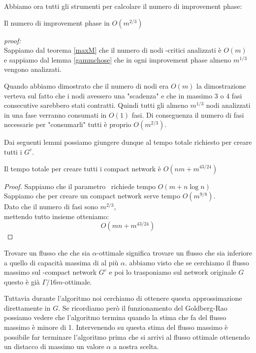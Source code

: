 Abbiamo ora tutti gli strumenti per calcolare il numero di improvement phase:
\begin{lemma}{}{}
    Il numero di improvement phase in $O(m^{2/3})$
\end{lemma}
\textit{proof:}\\
    Sappiamo dal teorema \ref{maxM} che il numero di nodi \gmm-critici analizzati è $O(m)$ e sappiamo dal lemma \ref{gammchose} che in ogni improvement phase almeno $m^{1/3}$ vengono analizzati.
    
    Quando abbiamo dimostrato che il numero di nodi era $O(m)$ la dimostrazione verteva sul fatto che i nodi avessero una "scadenza" e che in massimo 3 o 4 fasi consecutive sarebbero stati contratti.
    Quindi tutti gli almeno $m^{1/3}$ nodi analizzati in una fase verranno consumati in $O(1)$ fasi.
    Di conseguenza il numero di fasi necessarie per "consumarli" tutti è proprio $O(m^{2/3})$.\QED


Dai seguenti lemmi possiamo giungere dunque al tempo totale richiesto per creare tutti i $G^c$.
\begin{lemma}{}{}
    Il tempo totale per creare tutti i compact network è $O(nm+m^{43/24})$
\end{lemma} 
\begin{proof}
    Sappiamo che il parametro \gmm\ richiede tempo $O(m+n\log n)$\\
    Sappiamo che per creare un compact network serve tempo $O(m^{9/8})$.\\
    Dato che il numero di fasi sono $m^{2/3}$,\\
    mettendo tutto insieme otteniamo:
    \[O(mn+m^{43/24} )\]
    \QED
\end{proof}

Trovare un flusso che che sia $\alpha$-ottimale significa trovare un flusso che sia inferiore a quello di capacità massima di al più $\alpha$.
abbiamo visto che se cerchiamo il flusso massimo sul \gmm-compact network $G^c$ e poi lo trasponiamo sul network originale $G$ questo è già $\Gamma/16m$-ottimale. 

Tuttavia durante l'algoritmo noi cerchiamo di ottenere questa approssimazione direttamente in $G$. 
Se ricordiamo però il funzionamento del Goldberg-Rao possiamo vedere che l'algoritmo termina quando la stima che fa del flusso massimo è minore di 1.
Intervenendo su questa stima del flusso massimo è possibile far terminare l'algoritmo prima che si arrivi al flusso ottimale ottenendo un distacco di massimo un valore $\alpha$ a nostra scelta.

